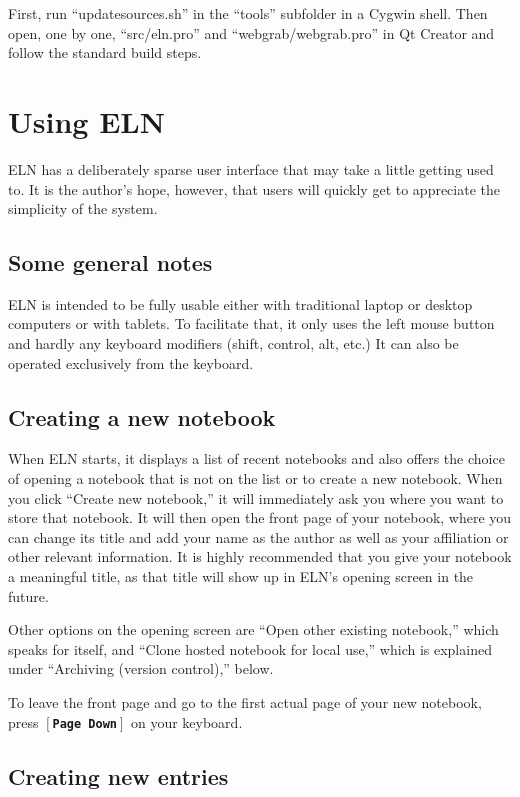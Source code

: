 \documentclass[11pt]{report}
\def\keystroke#1{$\left[\right.\!${\tt\bfseries #1}$\!\left.\right]$}
\def\key#1{\keystroke{#1}}
\begin{document}
First, run ``updatesources.sh'' in the
``tools'' subfolder in a Cygwin shell. Then open, one by one, ``src/eln.pro''
and ``webgrab/webgrab.pro'' in Qt
Creator and follow the standard build steps.

\chapter{Using ELN}

ELN has a deliberately sparse user interface that may take a little
getting used to. It is the author's hope, however, that users will
quickly get to appreciate the simplicity of the system.

\section{Some general notes}

ELN is intended to be fully usable either with traditional laptop or
desktop computers or with tablets. To facilitate that, it only uses
the left mouse button and hardly any keyboard modifiers (shift,
control, alt, etc.) It can also be operated exclusively from the
keyboard.

\section{Creating a new notebook}

When ELN starts, it displays a list of recent notebooks and also offers the
choice of opening a notebook that is not on the list or to create a
new notebook. When you click ``Create new notebook,'' it will
immediately ask you where you want to store that notebook. It will
then open the front page of your notebook, where you can change its
title and add your name as the author as well as your affiliation or
other relevant information. It is highly recommended that you give
your notebook a meaningful title, as that title will show up in ELN's
opening screen in the future.

Other options on the opening screen are ``Open other existing
notebook,'' which speaks for itself, and ``Clone hosted notebook for
local use,'' which is explained under ``Archiving (version control),''
below.

To leave the front page and go to the first actual page of your new
notebook, press \key{Page Down} on your keyboard.

\section{Creating new entries}
\end{document}
